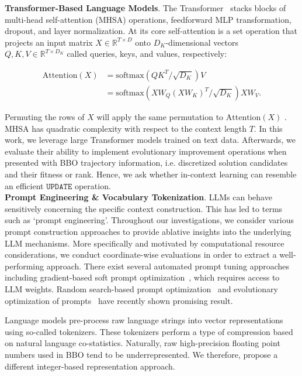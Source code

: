 %
\textbf{Transformer-Based Language Models}. The Transformer~\cite{vaswani2017attention} stacks blocks of multi-head self-attention (MHSA) operations, feedforward MLP transformation, dropout, and layer normalization.  At its core self-attention is a set operation that projects an input matrix $X \in \mathbb{R}^{T \times D}$ onto $D_K$-dimensional vectors $Q, K, V \in \mathbb{R}^{T \times D_K}$ called queries, keys, and values, respectively:

\vspace{-0.25cm}
\begin{align*}
    \mathrm{Attention}(X) &= \mathrm{softmax}\left(QK^T/\sqrt{D_K}\right) V \\
    &= \mathrm{softmax}\left(X W_Q \left(X W_K\right)^T/\sqrt{D_K}\right) X W_V.
\end{align*}

Permuting the rows of $X$ will apply the same permutation to $\text{Attention}(X)$ \cite[e.g., ][]{lee2019set, tang2021sensory, kossen2021self}. MHSA has quadratic complexity with respect to the context length $T$. In this work, we leverage large Transformer models trained on text data. Afterwards, we evaluate their ability to implement evolutionary improvement operations when presented with BBO trajectory information, i.e. discretized solution candidates and their fitness or rank. Hence, we ask whether in-context learning can resemble an efficient $\texttt{UPDATE}$ operation.\\
\textbf{Prompt Engineering \& Vocabulary Tokenization}. LLMs can behave sensitively concerning the specific context construction. This has led to terms such as `prompt engineering'. Throughout our investigations, we consider various prompt construction approaches to provide ablative insights into the underlying LLM mechanisms. More specifically and motivated by computational resource considerations, we conduct coordinate-wise evaluations in order to extract a well-performing approach. 
There exist several automated prompt tuning approaches including gradient-based soft prompt optimization~\cite{lester2021power}, which requires access to LLM weights. Random search-based prompt optimization~\cite{lu2023prompt}
and evolutionary optimization of prompts~\cite{li2023spell, guo2023connecting, fernando2023promptbreeder} have recently shown promising result.

Language models pre-process raw language strings into vector representations using so-called tokenizers. These tokenizers perform a type of compression based on natural language co-statistics. Naturally, raw high-precision floating point numbers used in BBO tend to be underrepresented. We therefore, propose a different integer-based representation approach.

